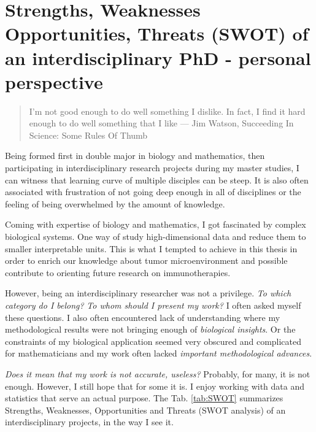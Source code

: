 \documentclass[12pt,]{book}
\theoremstyle{definition}
\theoremstyle{definition}
\theoremstyle{definition}
\theoremstyle{remark}
\begin{document}
\hypertarget{strengths-weaknesses-opportunities-threats-swot-of-an-interdisciplinary-phd---personal-perspective}{%
\section*{Strengths, Weaknesses Opportunities, Threats (SWOT) of an
interdisciplinary PhD - personal
perspective}\label{strengths-weaknesses-opportunities-threats-swot-of-an-interdisciplinary-phd---personal-perspective}}

\begin{quote}
I'm not good enough to do well something I dislike. In fact, I find it
hard enough to do well something that I like --- Jim Watson, Succeeding
In Science: Some Rules Of Thumb
\end{quote}

Being formed first in double major in biology and mathematics, then
participating in interdisciplinary research projects during my master
studies, I can witness that learning curve of multiple disciples can be
steep. It is also often associated with frustration of not going deep
enough in all of disciplines or the feeling of being overwhelmed by the
amount of knowledge.

Coming with expertise of biology and mathematics, I got fascinated by
complex biological systems. One way of study high-dimensional data and
reduce them to smaller interpretable units. This is what I tempted to
achieve in this thesis in order to enrich our knowledge about tumor
microenvironment and possible contribute to orienting future research on
immunotherapies.

However, being an interdisciplinary researcher was not a privilege.
\emph{To which category do I belong?} \emph{To whom should I present my
work?} I often asked myself these questions. I also often encountered
lack of understanding where my methodological results were not bringing
enough of \emph{biological insights}. Or the constraints of my
biological application seemed very obscured and complicated for
mathematicians and my work often lacked \emph{important methodological
advances}.

\emph{Does it mean that my work is not accurate, useless?} Probably, for
many, it is not enough. However, I still hope that for some it is. I
enjoy working with data and statistics that serve an actual purpose. The
Tab. \ref{tab:SWOT} summarizes Strengths, Weaknesses, Opportunities and
Threats (SWOT analysis) of an interdisciplinary projects, in the way I
see it.
\end{document}
